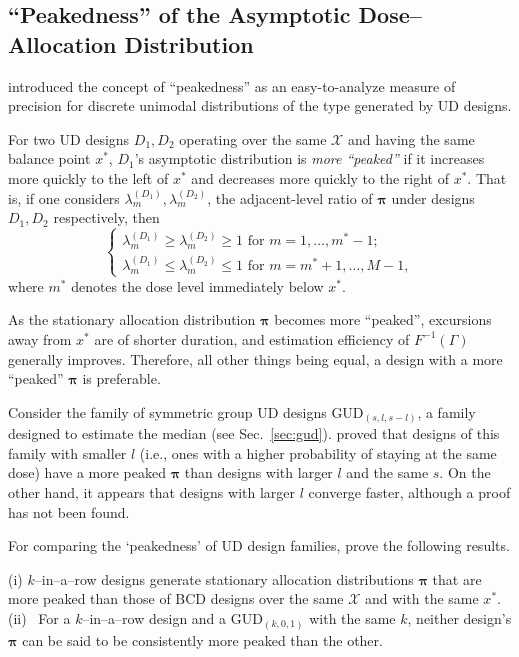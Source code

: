 \subsection{``Peakedness'' of the Asymptotic Dose--Allocation Distribution}

\cite{Giov:Pint:Pint:prop:1998} introduced the concept of ``peakedness'' as an easy-to-analyze measure of precision for discrete unimodal distributions of the type generated by UD designs.
%
\begin{defn}\label{def:peak}
For two UD designs $D_1,D_2$ operating over the same $\mathcal{X}$ and having the same balance point $x^*$, $D_1$'s asymptotic distribution is \emph{more ``peaked''} if it increases more quickly to the left of $x^*$ and decreases more quickly to the right of $x^*$. That is, if one considers $\lambda^{(D_1)}_m,\lambda^{(D_2)}_m$, the adjacent-level ratio of $\boldsymbol{\pi}$ under designs $D_1,D_2$ respectively, then
\begin{equation}\label{eq:peakdef}
\begin{cases}
\lambda^{(D_1)}_{m}\ge\lambda^{(D_2)}_{m}\ge 1\textrm{ for }m=1,\ldots,m^*-1; \\
\lambda^{(D_1)}_{m}\le\lambda^{(D_2)}_{m} \le 1\textrm{ for }m = m^*+1,\ldots,M-1,
\end{cases}
\end{equation}
where $m^*$ denotes the dose level immediately below $x^*$.
\end{defn}
%
As the stationary allocation distribution $\boldsymbol{\pi}$ becomes more ``peaked'', excursions away from $x^*$ are of shorter duration, and estimation efficiency of $F^{-1}\left(\Gamma\right)$ generally improves. Therefore, all other things being equal, a design with a more ``peaked'' $\boldsymbol{\pi}$ is preferable.

Consider the family of symmetric group UD designs GUD$_{(s,l,s-l)}$, a family designed to estimate the median (see Sec.~\ref{sec:gud}). \cite{Oron07} proved that designs of this family with smaller $l$ (i.e., ones with a higher probability of staying at the same dose) have a more peaked $\boldsymbol{\pi}$ than designs with larger $l$ and the same $s$. On the other hand, it appears that designs with larger $l$ converge faster, although a proof has not been found.

For comparing the `peakedness' of UD design families, \cite{Oron:Hoff:thek:2009} prove the following results.
%
\begin{thm}\label{thm:peak} (i) $k$--in--a--row designs generate stationary allocation distributions $\boldsymbol{\pi}$ that are more peaked than those of BCD designs over the same $\mathcal{X}$ and with the same $x^*$.
%
\noindent (ii) \ For a $k$--in--a--row design and a GUD$_{(k,0,1)}$ with the same $k$, neither design's $\boldsymbol{\pi}$ can be said to be consistently more peaked than the other.
\end{thm}

